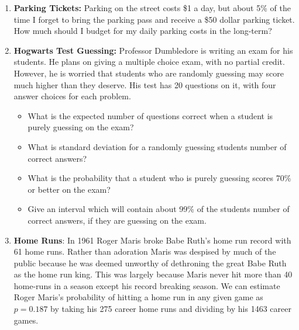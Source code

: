 \documentclass[
]{book}
\providecommand{\tightlist}{%
  \setlength{\itemsep}{0pt}\setlength{\parskip}{0pt}}
\theoremstyle{definition}
\theoremstyle{definition}
\theoremstyle{definition}
\theoremstyle{definition}
\theoremstyle{remark}
\begin{document}
\begin{enumerate}
\def\labelenumi{\arabic{enumi}.}
\item
  \textbf{Parking Tickets:} Parking on the street costs \$1 a day, but about 5\% of the time I forget to bring the parking pass and receive a \$50 dollar parking ticket. How much should I budget for my daily parking costs in the long-term?
\item
  \textbf{Hogwarts Test Guessing:} Professor Dumbledore is writing an exam for his students. He plans on giving a multiple choice exam, with no partial credit. However, he is worried that students who are randomly guessing may score much higher than they deserve. His test has 20 questions on it, with four answer choices for each problem.

  \begin{itemize}
  \tightlist
  \item
    What is the expected number of questions correct when a student is purely guessing on the exam?
  \item
    What is standard deviation for a randomly guessing students number of correct answers?
  \item
    What is the probability that a student who is purely guessing scores 70\% or better on the exam?
  \item
    Give an interval which will contain about 99\% of the students number of correct answers, if they are guessing on the exam.
  \end{itemize}
\item
  \textbf{Home Runs}: In 1961 Roger Maris broke Babe Ruth's home run record with 61 home runs. Rather than adoration Maris was despised by much of the public because he was deemed unworthy of dethroning the great Babe Ruth as the home run king. This was largely because Maris never hit more than 40 home-runs in a season except his record breaking season. We can estimate Roger Maris's probability of hitting a home run in any given game as \(p=0.187\) by taking his 275 career home runs and dividing by his 1463 career games.


\end{enumerate}
\end{document}
